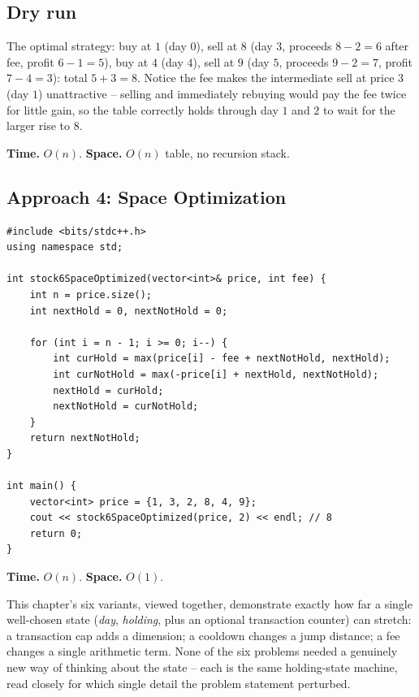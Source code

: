 \subsection*{Dry run}


The optimal strategy: buy at $1$ (day $0$), sell at $8$ (day $3$,
proceeds $8-2=6$ after fee, profit $6-1=5$), buy at $4$ (day $4$), sell
at $9$ (day $5$, proceeds $9-2=7$, profit $7-4=3$): total $5+3=8$.
Notice the fee makes the intermediate sell at price $3$ (day $1$)
unattractive -- selling and immediately rebuying would pay the fee
twice for little gain, so the table correctly holds through day $1$ and
$2$ to wait for the larger rise to $8$.

\begin{complexitybox}
\textbf{Time.} $O(n)$.
\textbf{Space.} $O(n)$ table, no recursion stack.
\end{complexitybox}

\subsection*{Approach 4: Space Optimization}

\begin{lstlisting}
#include <bits/stdc++.h>
using namespace std;

int stock6SpaceOptimized(vector<int>& price, int fee) {
    int n = price.size();
    int nextHold = 0, nextNotHold = 0;

    for (int i = n - 1; i >= 0; i--) {
        int curHold = max(price[i] - fee + nextNotHold, nextHold);
        int curNotHold = max(-price[i] + nextHold, nextNotHold);
        nextHold = curHold;
        nextNotHold = curNotHold;
    }
    return nextNotHold;
}

int main() {
    vector<int> price = {1, 3, 2, 8, 4, 9};
    cout << stock6SpaceOptimized(price, 2) << endl; // 8
    return 0;
}
\end{lstlisting}

\begin{complexitybox}
\textbf{Time.} $O(n)$.
\textbf{Space.} $O(1)$.
\end{complexitybox}

\begin{takeawaybox}
This chapter's six variants, viewed together, demonstrate exactly how
far a single well-chosen state (\textit{day}, \textit{holding}, plus an
optional transaction counter) can stretch: a transaction cap adds a
dimension; a cooldown changes a jump distance; a fee changes a single
arithmetic term. None of the six problems needed a genuinely new way of
thinking about the state -- each is the same holding-state machine,
read closely for which single detail the problem statement perturbed.
\end{takeawaybox}
